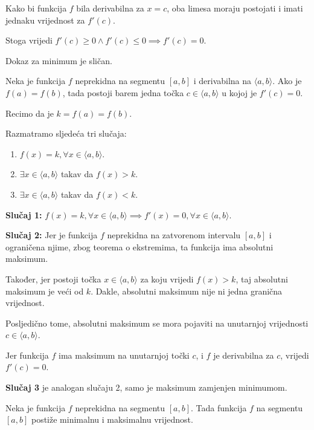 Kako bi funkcija $f$ bila derivabilna za $x=c$, oba limesa moraju postojati i
imati jednaku vrijednost za $f'(c)$.

Stoga vrijedi $f'(c)\geq 0 \land f'(c)\leq 0 \implies f'(c)=0$.

Dokaz za minimum je sličan.

\begin{theorem}
    Neka je funkcija $f$ neprekidna na segmentu $[a,b]$ i derivabilna na $\langle a,b \rangle$.
    Ako je $f(a) = f(b)$, tada postoji barem jedna točka $c\in\langle a,b \rangle$
    u kojoj je $f'(c)=0$.
\end{theorem}

Recimo da je $k=f(a)=f(b)$.

\noindent
Razmatramo sljedeća tri slučaja:
\begin{enumerate}
    \item $f(x) = k, \forall x\in \langle a,b \rangle$.
    \item $\exists x\in \langle a,b \rangle$ takav da $f(x) > k$.
    \item $\exists x\in \langle a,b \rangle$ takav da $f(x) < k$.
\end{enumerate}

\noindent
\textbf{Slučaj 1:} $f(x) = k, \forall x\in \langle a,b \rangle \implies f'(x) = 0, \forall x\in \langle a,b \rangle$.

\bigskip
\noindent
\textbf{Slučaj 2:} Jer je funkcija $f$ neprekidna na zatvorenom intervalu $[a,b]$
i ograničena njime, zbog teorema o ekstremima, ta funkcija ima absolutni maksimum.

Također, jer postoji točka $x\in \langle a,b \rangle$ za koju vrijedi $f(x)>k$,
taj absolutni maksimum je veći od $k$.
Dakle, absolutni maksimum nije ni jedna granična vrijednost.

Posljedično tome, absolutni maksimum se mora pojaviti na unutarnjoj vrijednosti
$c\in\langle a,b \rangle$.

Jer funkcija $f$ ima maksimum na unutarnjoj točki $c$, i $f$ je derivabilna za
$c$, vrijedi $f'(c)=0$.

\bigskip
\noindent
\textbf{Slučaj 3} je analogan slučaju 2, samo je maksimum zamjenjen minimumom.

\newpage
\begin{theorem}
    Neka je funkcija $f$ neprekidna na segmentu $[a,b]$. Tada funkcija $f$ na segmentu
    $[a,b]$ postiže minimalnu i maksimalnu vrijednost.
\end{theorem}

